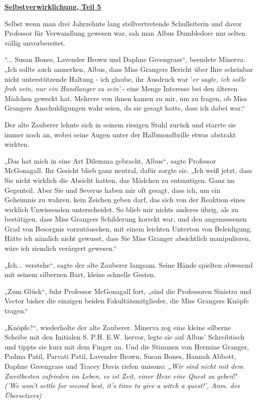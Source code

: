 

\hypertarget{selbstverwirklichung-teil-5}{%

\textbf{\uline{Selbstverwirklichung, Teil 5}}

\hfill\break Selbst wenn man drei Jahrzehnte lang stellvertretende Schulleiterin und davor Professor für Verwandlung gewesen war, sah man Albus Dumbledore nur selten völlig unvorbereitet.

“... Susan Bones, Lavender Brown und Daphne Greengrass“, beendete Minerva. „Ich sollte auch anmerken, Albus, dass Miss Grangers Bericht über Ihre scheinbar nicht unterstützende Haltung - ich glaube, ihr Ausdruck war '\emph{er sagte, ich solle froh sein, nur ein Handlanger zu sein'} - eine Menge Interesse bei den älteren Mädchen geweckt hat. Mehrere von ihnen kamen zu mir, um zu fragen, ob Miss Grangers Anschuldigungen wahr seien, da sie gesagt hatte, dass ich dabei war.“

Der alte Zauberer lehnte sich in seinem riesigen Stuhl zurück und starrte sie immer noch an, wobei seine Augen unter der Halbmondbrille etwas abstrakt wirkten.

„Das hat mich in eine Art Dilemma gebracht, Albus“, sagte Professor McGonagall. Ihr Gesicht blieb ganz neutral, dafür sorgte sie. „Ich weiß jetzt, dass Sie nicht wirklich die Absicht hatten, das Mädchen zu entmutigen. Ganz im Gegenteil. Aber Sie und Severus haben mir oft gesagt, dass ich, um ein Geheimnis zu wahren, kein Zeichen geben darf, das sich von der Reaktion eines wirklich Unwissenden unterscheidet. So blieb mir nichts anderes übrig, als zu bestätigen, dass Miss Grangers Schilderung korrekt war, und den angemessenen Grad von Besorgnis vorzutäuschen, mit einem leichten Unterton von Beleidigung. Hätte ich nämlich nicht gewusst, dass Sie Miss Granger absichtlich manipulieren, wäre ich ziemlich verärgert gewesen.“

„Ich... verstehe“, sagte der alte Zauberer langsam. Seine Hände spielten abwesend mit seinem silbernen Bart, kleine schnelle Gesten.

„Zum Glück“, fuhr Professor McGonagall fort, „sind die Professoren Sinistra und Vector bisher die einzigen beiden Fakultätsmitglieder, die Miss Grangers Knöpfe tragen.“

„Knöpfe?“, wiederholte der alte Zauberer. Minerva zog eine kleine silberne Scheibe mit den Initialen S. P.H. E.W. hervor, legte sie auf Albus' Schreibtisch und tippte sie kurz mit dem Finger an. Und die Stimmen von Hermine Granger, Padma Patil, Parvati Patil, Lavender Brown, Susan Bones, Hannah Abbott, Daphne Greengrass und Tracey Davis riefen unisono: „\emph{Wir sind nicht mit dem Zweitbesten zufrieden im Leben, es ist Zeit, einer Hexe eine Quest zu geben}!"\\ \emph{('We won't settle for second best, it's time to give a witch a quest!', Anm. des Übersetzers)}

}
